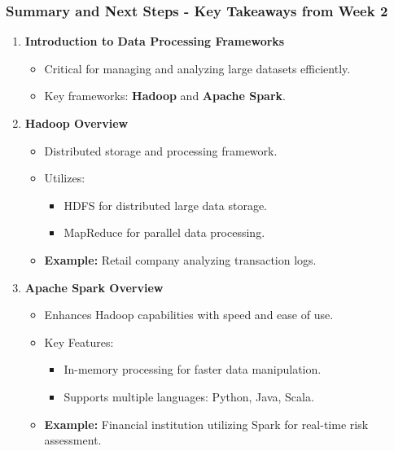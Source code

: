 \documentclass{beamer}
\begin{document}
\begin{frame}[fragile]
    \frametitle{Summary and Next Steps - Key Takeaways from Week 2}
    \begin{enumerate}
        \item \textbf{Introduction to Data Processing Frameworks}
        \begin{itemize}
            \item Critical for managing and analyzing large datasets efficiently.
            \item Key frameworks: \textbf{Hadoop} and \textbf{Apache Spark}.
        \end{itemize}
        
        \item \textbf{Hadoop Overview}
        \begin{itemize}
            \item Distributed storage and processing framework.
            \item Utilizes:
            \begin{itemize}
                \item HDFS for distributed large data storage.
                \item MapReduce for parallel data processing.
            \end{itemize}
            \item \textbf{Example:} Retail company analyzing transaction logs.
        \end{itemize}
        
        \item \textbf{Apache Spark Overview}
        \begin{itemize}
            \item Enhances Hadoop capabilities with speed and ease of use.
            \item Key Features:
            \begin{itemize}
                \item In-memory processing for faster data manipulation.
                \item Supports multiple languages: Python, Java, Scala.
            \end{itemize}
            \item \textbf{Example:} Financial institution utilizing Spark for real-time risk assessment.
        \end{itemize}
    \end{enumerate}
\end{frame}
\end{document}
